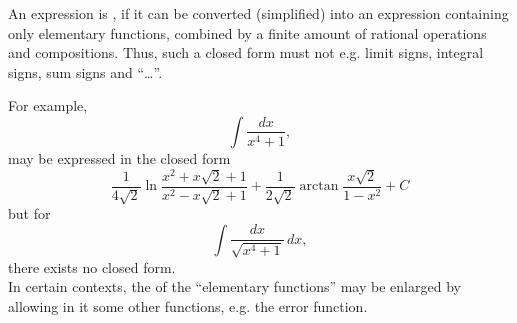 \documentclass[12pt]{article}
\theoremstyle{definition}
\begin{document}
An expression is , if it can be converted (simplified) into an expression containing only elementary functions, combined by a finite amount of rational operations and compositions.
Thus, such a closed form must not  e.g. limit signs, integral signs, sum signs and ``\ldots''.

For example, 
$$\int\!\!\frac{dx}{x^4\!+\!1},$$
may be expressed in the closed form
$$\frac{1}{4\sqrt{2}}\ln\frac{x^2\!+\!x\sqrt{2}\!+\!1}{x^2\!-\!x\sqrt{2}\!+\!1}+
\frac{1}{2\sqrt{2}}\arctan\frac{x\sqrt{2}}{1\!-\!x^2}+C$$
but for
$$\int\!\!\frac{dx}{\sqrt{x^4\!+\!1}}\,dx,$$
there exists no closed form.\\

In certain contexts, the  of the ``elementary functions'' may be enlarged by allowing in it some other functions, e.g. the error function.

\end{document}
